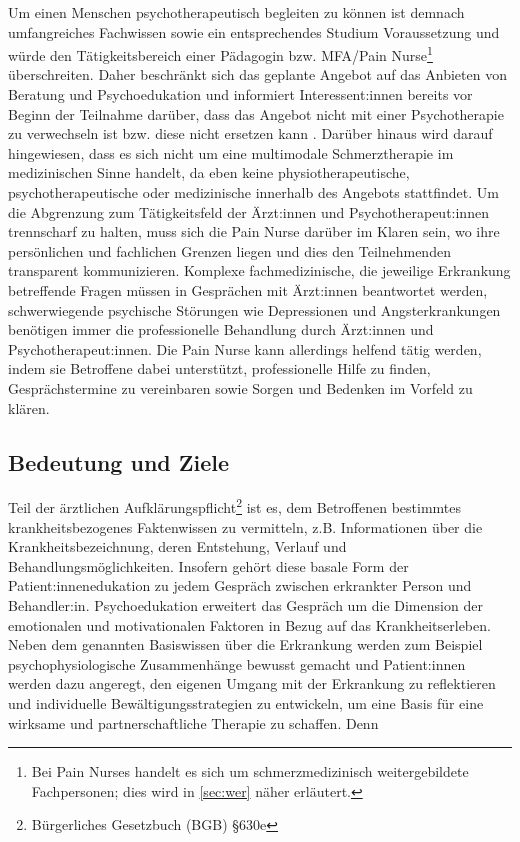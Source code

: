 \documentclass[
  twoside,
  parskip=half-,
]{scrreprt}
\begin{document}
\begin{praxis}
  Um einen Menschen psychotherapeutisch begleiten zu können ist demnach umfangreiches Fachwissen sowie ein entsprechendes Studium Voraussetzung und würde den Tätigkeitsbereich einer Pädagogin bzw. MFA/Pain Nurse\footnote{Bei Pain Nurses handelt es sich um schmerzmedizinisch weitergebildete Fachpersonen; dies wird in \autoref{sec:wer} näher erläutert.} überschreiten. Daher beschränkt sich das geplante Angebot auf das Anbieten von Beratung und Psychoedukation und informiert Interessent:innen bereits vor Beginn der Teilnahme darüber, dass das Angebot nicht mit einer Psychotherapie zu verwechseln ist bzw. diese nicht ersetzen kann \autocite[vgl.][898]{integrativePsycho}. Darüber hinaus wird darauf hingewiesen, dass es sich nicht um eine multimodale Schmerztherapie im medizinischen Sinne handelt, da eben keine physiotherapeutische, psychotherapeutische oder medizinische  innerhalb des Angebots stattfindet. Um die Abgrenzung zum Tätigkeitsfeld der Ärzt:innen und Psychotherapeut:innen trennscharf zu halten, muss sich die Pain Nurse darüber im Klaren sein, wo ihre persönlichen und fachlichen Grenzen liegen und dies den Teilnehmenden transparent kommunizieren. Komplexe fachmedizinische, die jeweilige Erkrankung betreffende Fragen müssen in Gesprächen mit Ärzt:innen beantwortet werden, schwerwiegende psychische Störungen wie Depressionen und Angsterkrankungen benötigen immer die professionelle Behandlung durch Ärzt:innen und Psychotherapeut:innen. Die Pain Nurse kann allerdings helfend tätig werden, indem sie Betroffene dabei unterstützt, professionelle Hilfe zu finden, Gesprächstermine zu vereinbaren sowie Sorgen und Bedenken im Vorfeld zu klären.
\end{praxis}


\subsection{Bedeutung und Ziele}

Teil der ärztlichen Aufklärungspflicht\footnote{Bürgerliches Gesetzbuch (BGB) §630e} ist es, dem Betroffenen bestimmtes krankheitsbezogenes Faktenwissen zu vermitteln, z.B. Informationen über die Krankheitsbezeichnung, deren Entstehung, Verlauf und Behandlungsmöglichkeiten. Insofern gehört diese basale Form der Patient:innenedukation zu jedem Gespräch zwischen erkrankter Person und Behandler:in. Psychoedukation erweitert das Gespräch um die Dimension der emotionalen und motivationalen Faktoren in Bezug auf das Krankheitserleben. Neben dem genannten Basiswissen über die Erkrankung werden zum Beispiel psychophysiologische Zusammenhänge bewusst gemacht und Patient:innen werden dazu angeregt, den eigenen Umgang mit der Erkrankung zu reflektieren und individuelle Bewältigungsstrategien zu entwickeln, um eine Basis für eine wirksame und partnerschaftliche Therapie zu schaffen. Denn  
\end{document}
